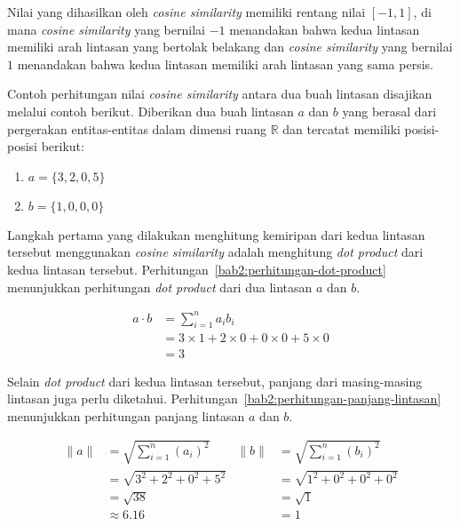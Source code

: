 Nilai yang dihasilkan oleh \textit{cosine similarity} memiliki rentang nilai $[-1, 1]$, di mana \textit{cosine similarity} yang bernilai $-1$ menandakan bahwa kedua lintasan memiliki arah lintasan yang bertolak belakang dan \textit{cosine similarity} yang bernilai $1$ menandakan bahwa kedua lintasan memiliki arah lintasan yang sama persis.

Contoh perhitungan nilai \textit{cosine similarity} antara dua buah lintasan disajikan melalui contoh berikut. Diberikan dua buah lintasan $a$ dan $b$ yang berasal dari pergerakan entitas-entitas dalam dimensi ruang $\mathbb{R}$ dan tercatat memiliki posisi-posisi berikut:

\begin{enumerate}
    \item $a = \{ 3, 2, 0, 5 \}$
    \item $b = \{ 1, 0, 0, 0 \}$
\end{enumerate}

Langkah pertama yang dilakukan menghitung kemiripan dari kedua lintasan tersebut menggunakan \textit{cosine similarity} adalah menghitung \textit{dot product} dari kedua lintasan tersebut. Perhitungan~\ref{bab2:perhitungan-dot-product} menunjukkan perhitungan \textit{dot product} dari dua lintasan $a$ dan $b$.

\begin{equation}
    \begin{aligned}
        a \cdot b & =  \sum_{i=1}^{n}{a_i b_i} \\
        & = 3 \times 1 + 2 \times 0 + 0 \times 0 + 5 \times 0 \\
        & = 3
    \end{aligned}
    \label{bab2:perhitungan-dot-product}
\end{equation}

Selain \textit{dot product} dari kedua lintasan tersebut, panjang dari masing-masing lintasan juga perlu diketahui. Perhitungan~\ref{bab2:perhitungan-panjang-lintasan} menunjukkan perhitungan panjang lintasan $a$ dan $b$.

\begin{equation}
    \begin{aligned}
        \|a\| & = \sqrt{\sum_{i=1}^{n}{(a_i)^2}} & \|b\| & = \sqrt{\sum_{i=1}^{n}{(b_i)^2}} \\
        & = \sqrt{3^2 + 2^2 + 0^2 + 5^2} & & = \sqrt{1^2 + 0^2 + 0^2 + 0^2}  \\
        & = \sqrt{38} & & = \sqrt{1} \\
        & \approx 6.16 & & = 1
    \end{aligned}
    \label{bab2:perhitungan-panjang-lintasan}
\end{equation}

